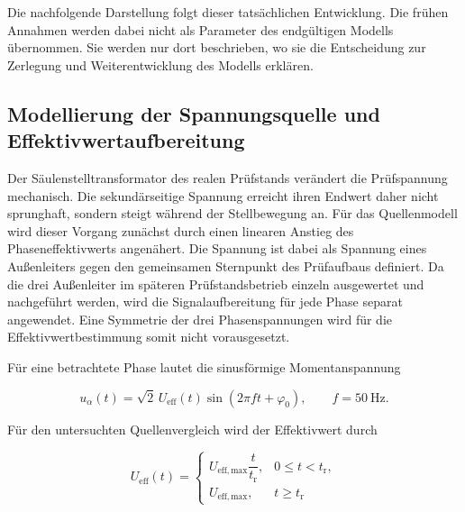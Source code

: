 Die nachfolgende Darstellung folgt dieser tatsächlichen Entwicklung. Die
frühen Annahmen werden dabei nicht als Parameter des endgültigen Modells
übernommen. Sie werden nur dort beschrieben, wo sie die Entscheidung zur
Zerlegung und Weiterentwicklung des Modells erklären.



\subsection{Modellierung der Spannungsquelle und Effektivwertaufbereitung}
\label{sec:spannungsquelle_osg}

Der Säulenstelltransformator des realen Prüfstands verändert die
Prüfspannung mechanisch. Die sekundärseitige Spannung erreicht ihren Endwert
daher nicht sprunghaft, sondern steigt während der Stellbewegung an. Für das
Quellenmodell wird dieser Vorgang zunächst durch einen linearen Anstieg des
Phaseneffektivwerts angenähert. Die Spannung ist dabei als Spannung eines
Außenleiters gegen den gemeinsamen Sternpunkt des Prüfaufbaus definiert. Da
die drei Außenleiter im späteren Prüfstandsbetrieb einzeln ausgewertet und
nachgeführt werden, wird die Signalaufbereitung für jede Phase separat
angewendet. Eine Symmetrie der drei Phasenspannungen wird für die
Effektivwertbestimmung somit nicht vorausgesetzt.

Für eine betrachtete Phase lautet die sinusförmige Momentanspannung

\begin{equation}
    u_{\alpha}(t)
    =
    \sqrt{2}\,U_\mathrm{eff}(t)
    \sin\!\left(2\pi f t+\varphi_0\right),
    \qquad f=\SI{50}{\hertz}.
    \label{eq:kap5_momentanspannung}
\end{equation}

Für den untersuchten Quellenvergleich wird der Effektivwert durch

\begin{equation}
    U_\mathrm{eff}(t)
    =
    \begin{cases}
        U_\mathrm{eff,max}\dfrac{t}{t_\mathrm{r}},
        & 0\leq t<t_\mathrm{r}, \\[3mm]
        U_\mathrm{eff,max},
        & t\geq t_\mathrm{r}
    \end{cases}
    \label{eq:kap5_spannungsrampe}
\end{equation}

